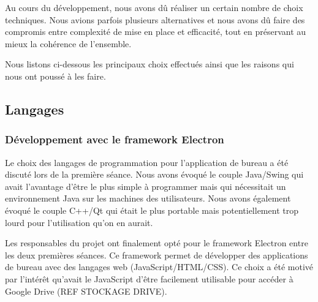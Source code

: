 \par
Au cours du développement, nous avons dû réaliser un certain nombre de choix techniques. Nous avions parfois plusieurs alternatives et nous avons dû faire des compromis entre complexité de mise en place et efficacité, tout en préservant au mieux la cohérence de l'ensemble.

\par Nous listons ci-dessous les principaux choix effectués ainsi que les raisons qui nous ont poussé à les faire.

\subsection{Langages}

\subsubsection{Développement avec le framework Electron}
\par
Le choix des langages de programmation pour l'application de bureau a été discuté lors de la première séance. Nous avons évoqué le couple Java/Swing qui avait l'avantage d'être le plus simple à programmer mais qui nécessitait un environnement Java sur les machines des utilisateurs. Nous avons également évoqué le couple C++/Qt qui était le plus portable mais potentiellement trop lourd pour l'utilisation qu'on en aurait. 
\par
Les responsables du projet ont finalement opté pour le framework Electron entre les deux premières séances. Ce framework permet de développer des applications de bureau avec des langages web (JavaScript/HTML/CSS). Ce choix a été motivé par l'intérêt qu'avait le JavaScript d'être facilement utilisable pour accéder à Google Drive (REF STOCKAGE DRIVE).

